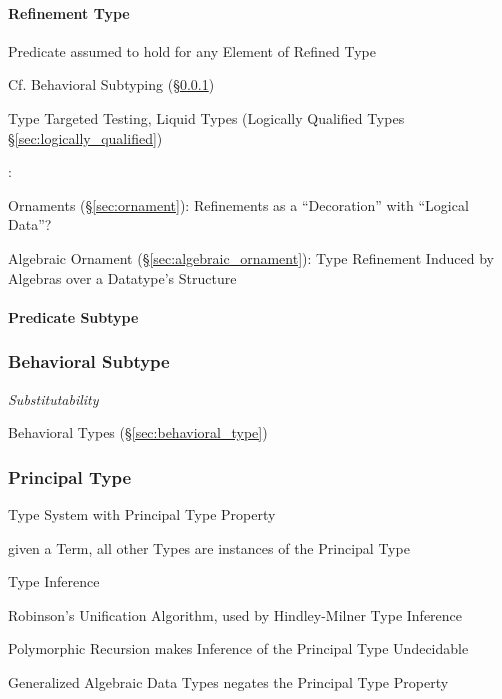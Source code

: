 \paragraph{Refinement Type}\label{sec:refinement_type}\hfill

Predicate assumed to hold for any Element of Refined Type

\fist Cf. Behavioral Subtyping (\S\ref{sec:behavioral_subtype})

Type Targeted Testing, Liquid Types (Logically Qualified Types
\S\ref{sec:logically_qualified})


\asterism


\cite{mcbride13}:

Ornaments (\S\ref{sec:ornament}): Refinements as a ``Decoration'' with
``Logical Data''? %

Algebraic Ornament (\S\ref{sec:algebraic_ornament}): Type Refinement
Induced by Algebras over a Datatype's Structure



\paragraph{Predicate Subtype}\label{sec:predicate_subtype}\hfill



\subsubsection{Behavioral Subtype}\label{sec:behavioral_subtype}

\emph{Substitutability}

\fist Behavioral Types (\S\ref{sec:behavioral_type})



\subsubsection{Principal Type}\label{sec:principal_type}

Type System with Principal Type Property

given a Term, all other Types are instances of the Principal Type

Type Inference

Robinson's Unification Algorithm, used by Hindley-Milner Type
Inference

Polymorphic Recursion makes Inference of the Principal Type Undecidable

Generalized Algebraic Data Types negates the Principal Type Property



